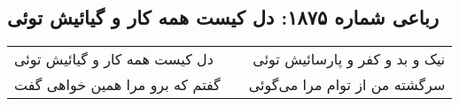 \begin{center}
\section*{رباعی شماره ۱۸۷۵: دل کیست همه کار و گیائیش توئی}
\label{sec:1875}
\begin{longtable}{l p{0.5cm} r}
دل کیست همه کار و گیائیش توئی
&&
نیک و بد و کفر و پارسائیش توئی
\\
گفتم که برو مرا همین خواهی گفت
&&
سرگشته من از توام مرا می‌گوئی
\\
\end{longtable}
\end{center}
